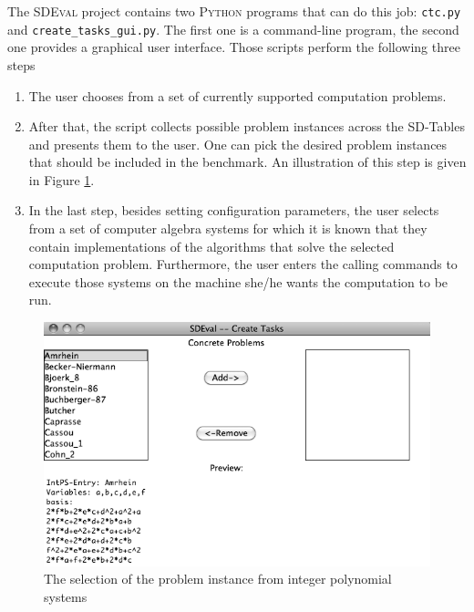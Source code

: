 \documentclass[oribibl,11pt]{article}
\begin{document}
The \textsc{SDEval} project contains two \textsc{Python} programs that can do
this job: \texttt{ctc.py} and \texttt{create\_{\allowbreak}tasks\_gui.py}.
The first one is a command-line program, the second one provides a
graphical user interface.
Those scripts perform the following three steps
\begin{enumerate}

  \item The user chooses from a set of currently supported computation problems. %
  \item After that, the script collects possible problem instances
    across the SD-Tables and presents them to the user. One can pick
    the desired problem instances that should be included in the
    benchmark. An illustration of this step is given in Figure
    \ref{fgr:selectPI}.
  \item In the last step, besides setting configuration parameters,
    the user selects from a set of computer algebra systems for which
    it is known that they contain implementations of the algorithms
    that solve the selected computation problem. Furthermore, the
    user enters the calling  commands to execute those systems on
    the machine she/he wants the  computation to be run.
\end{enumerate}

\begin{figure}
\caption{The selection of the problem instance from integer polynomial
  systems}
\label{fgr:selectPI}
\begin{center}
\includegraphics[width=.5\textwidth]{pics/problemSelectionWindow.png}
\end{center}
\end{figure}
\end{document}
